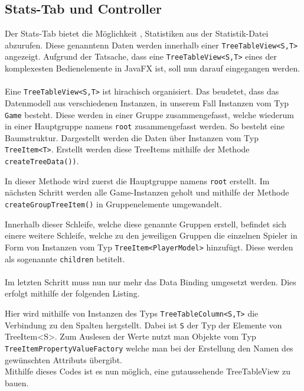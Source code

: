 \subsection{Stats-Tab und Controller}\label{sssec:statsController}
Der Stats-Tab bietet die Möglichkeit , Statistiken aus der Statistik-Datei abzurufen.
Diese genanntenn Daten werden innerhalb einer \lstinline[style=java]{TreeTableView<S,T>} angezeigt.
Aufgrund der Tatsache, dass eine \lstinline[style=java]{TreeTableView<S,T>} eines der komplexesten Bedienelemente in JavaFX ist, soll nun darauf eingegangen werden.\\\\
Eine \lstinline[style=java]{TreeTableView<S,T>} ist hirachisch organisiert.
Das beudetet, dass das Datenmodell aus verschiedenen Instanzen, in unserem Fall Instanzen vom Typ \lstinline[style=java]{Game} besteht.
Diese werden in einer Gruppe zusammengefasst, welche wiederum in einer Hauptgruppe namens \lstinline[style=java]{root} zusammengefasst werden.
So besteht eine Baumstruktur.
Dargestellt werden die Daten über Instanzen vom Typ \lstinline[style=java]{TreeItem<T>}.
Erstellt werden diese TreeItems mithilfe der Methode \lstinline[style=java]{createTreeData())}.

In dieser Methode wird zuerst die Hauptgruppe namens \lstinline[style=java]{root} erstellt.
Im nächsten Schritt werden alle Game-Instanzen geholt und mithilfe der Methode \lstinline[style=java]{createGroupTreeItem()} in Gruppenelemente umgewandelt.

Innerhalb dieser Schleife, welche diese genannte Gruppen erstell, befindet sich einere weitere Schleife, welche zu den jeweiligen Gruppen die einzelnen Spieler in Form von Instanzen vom Typ \lstinline[style=java]{TreeItem<PlayerModel>} hinzufügt.
Diese werden als sogenannte \lstinline[style=java]{children} betitelt.\\\\
Im letzten Schritt muss nun nur mehr das Data Binding umgesetzt werden.
Dies erfolgt mithilfe der folgenden Listing.

Hier wird mithilfe von Instanzen des Typs \lstinline[style=java]{TreeTableColumn<S,T>} die Verbindung zu den Spalten hergstellt.
Dabei ist \lstinline[style=java]{S} der Typ der Elemente von {TreeItem<S>}.
Zum Auslesen der Werte nutzt man Objekte vom Typ \lstinline[style=java]{TreeItemPropertyValueFactory} welche man bei der Erstellung den Namen des gewünschten Attributs übergibt.\\
Mithilfe dieses Codes ist es nun möglich, eine gutaussehende TreeTableView zu bauen.
